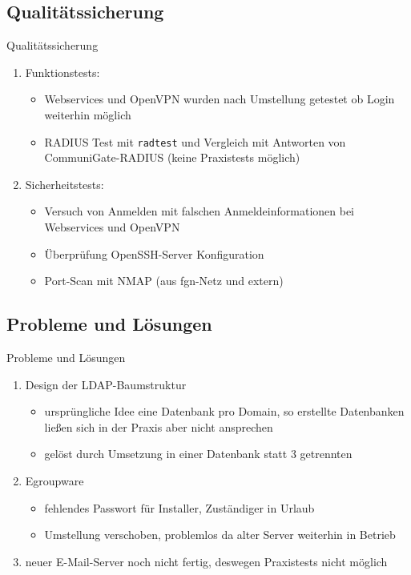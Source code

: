 \documentclass[handout,svgnames]{beamer}
\begin{document}
\subsection{Qualitätssicherung}
\begin{frame}{Qualitätssicherung}
\begin{enumerate}
	\item Funktionstests:
	\begin{itemize}
		\item Webservices und OpenVPN wurden nach Umstellung getestet ob Login weiterhin möglich
		\item RADIUS Test mit \texttt{radtest} und Vergleich mit Antworten von CommuniGate-RADIUS (keine Praxistests möglich)
	\end{itemize}
	\item Sicherheitstests:
	\begin{itemize}
		\item Versuch von Anmelden mit falschen Anmeldeinformationen bei Webservices und OpenVPN
		\item Überprüfung OpenSSH-Server Konfiguration
		\item Port-Scan mit NMAP (aus fgn-Netz und extern)
	\end{itemize}
\end{enumerate}
\end{frame}


\subsection{Probleme und Lösungen}
\begin{frame}{Probleme und Lösungen}
\begin{enumerate}
	\item Design der LDAP-Baumstruktur
	\begin{itemize}
		\item ursprüngliche Idee eine Datenbank pro Domain, so erstellte Datenbanken ließen sich in der Praxis aber nicht ansprechen
		\item gelöst durch Umsetzung in einer Datenbank statt 3 getrennten
	\end{itemize}
	\item Egroupware
	\begin{itemize}
		\item fehlendes Passwort für Installer, Zuständiger in Urlaub
		\item Umstellung verschoben, problemlos da alter Server weiterhin in Betrieb
	\end{itemize}
	\item neuer E-Mail-Server noch nicht fertig, deswegen Praxistests nicht möglich
\end{enumerate}
\end{frame}
\end{document}
